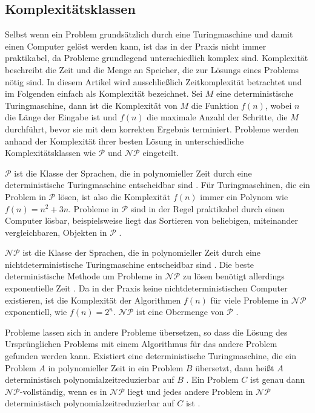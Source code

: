 \documentclass[conference,compsoc,final,a4paper]{IEEEtran}
\begin{document}
\subsection{Komplexitätsklassen}
Selbst wenn ein Problem grundsätzlich durch eine Turingmaschine und damit einen Computer gelöst werden kann, ist das in der Praxis nicht immer praktikabel, da Probleme grundlegend unterschiedlich komplex sind. Komplexität beschreibt die Zeit und die Menge an Speicher, die zur Lösungs eines Problems nötig sind. In diesem Artikel wird ausschließlich Zeitkomplexität betrachtet und im Folgenden einfach als Komplexität bezeichnet.
Sei $M$ eine deterministische Turingmaschine, dann ist die Komplexität von $M$ die Funktion $f(n)$, wobei $n$ die Länge der Eingabe ist und $f(n)$ die maximale Anzahl der Schritte, die $M$ durchführt, bevor sie mit dem korrekten Ergebnis terminiert. Probleme werden anhand der Komplexität ihrer besten Lösung in unterschiedliche Komplexitätsklassen wie $\mathcal{P}$ und $\mathcal{NP}$ eingeteilt. \cite{theory_of_computing}

$\mathcal{P}$ ist die Klasse der Sprachen, die in polynomieller Zeit durch eine deterministische Turingmaschine entscheidbar sind \cite{handbook_theoretical_computer_science}. Für Turingmaschinen, die ein Problem in $\mathcal{P}$ lösen, ist also die Komplexität $f(n)$ immer ein Polynom wie $f(n) = n^2 + 3n$. Probleme in $\mathcal{P}$ sind in der Regel praktikabel durch einen Computer lösbar, beispielsweise liegt das Sortieren von beliebigen, miteinander vergleichbaren, Objekten in $\mathcal{P}$ \cite{theory_of_computing}.

$\mathcal{NP}$ ist die Klasse der Sprachen, die in polynomieller Zeit durch eine nichtdeterministische Turingmaschine entscheidbar sind \cite{handbook_theoretical_computer_science}. Die beste deterministische Methode um Probleme in $\mathcal{NP}$ zu lösen benötigt allerdings exponentielle Zeit \cite{theory_of_computing}. Da in der Praxis keine nichtdeterministischen Computer existieren, ist die Komplexität der Algorithmen $f(n)$ für viele Probleme in $\mathcal{NP}$ exponentiell, wie $f(n) = 2^n$. $\mathcal{NP}$ ist eine Obermenge von $\mathcal{P}$ \cite{handbook_theoretical_computer_science}.

Probleme lassen sich in andere Probleme übersetzen, so dass die Lösung des Ursprünglichen Problems mit einem Algorithmus für das andere Problem gefunden werden kann. Existiert eine deterministische Turingmaschine, die ein Problem $A$ in polynomieller Zeit in ein Problem $B$ übersetzt, dann heißt $A$ deterministisch polynomialzeitreduzierbar auf $B$ \cite{theory_of_computing}. Ein Problem $C$ ist genau dann $\mathcal{NP}$-vollständig, wenn es in $\mathcal{NP}$ liegt und jedes andere Problem in $\mathcal{NP}$ deterministisch polynomialzeitreduzierbar auf $C$ ist \cite{handbook_theoretical_computer_science}.
\end{document}
